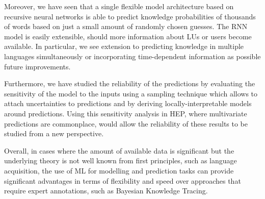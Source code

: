 Moreover, we have seen that a single flexible model architecture based on recursive neural networks is able to predict knowledge probabilities of thousands of words based on just a small amount of randomly chosen guesses. The RNN model is easily extensible, should more information about LUs or users become available. In particular, we see extension to predicting knowledge in multiple languages simultaneously or incorporating time-dependent information as possible future improvements.

Furthermore, we have studied the reliability of the predictions by evaluating the sensitivity of the model to the inputs using a sampling technique which allows to attach uncertainties to predictions and by deriving locally-interpretable models around predictions. Using this sensitivity analysis in HEP, where multivariate predictions are commonplace, would allow the reliability of these results to be studied from a new perspective.

Overall, in cases where the amount of available data is significant but the underlying theory is not well known from first principles, such as language acquisition, the use of ML for modelling and prediction tasks can provide significant advantages in terms of flexibility and speed over approaches that require expert annotations, such as Bayesian Knowledge Tracing.